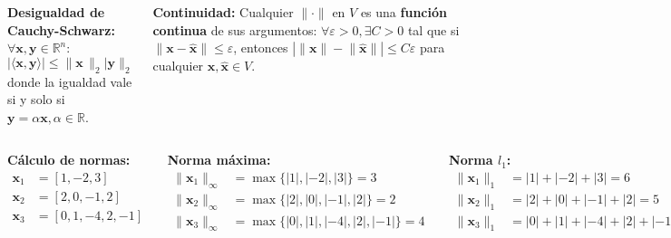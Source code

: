 \documentclass[9pt, aspectratio=169]{beamer}
\begin{document}
\begin{frame}
\begin{columns}[t]
\textbf{Desigualdad de Cauchy-Schwarz:} $\forall \bm{x}, \bm{y} \in \mathbb{R}^n$:
\[ | \langle \bm{x}, \bm{y} \rangle | \leq \lVert \bm{x} \, \rVert_2 \lvert \bm{y} \rVert_2 \]
donde la igualdad vale si y solo si $\bm{y} = \alpha \bm{x}, \alpha \in \mathbb{R}$.

\textbf{Continuidad:} Cualquier $\lVert \cdot \rVert$ en $V$ es una \textbf{función continua} de sus argumentos: $\forall \varepsilon > 0, \exists C > 0$ tal que si $\lVert \bm{x} - \hat{\bm{x}} \rVert \leq \varepsilon$, entonces $| \lVert \bm{x} \rVert - \lVert \hat{\bm{x}} \rVert | \leq C \varepsilon$ para cualquier $\bm{x}, \hat{\bm{x}} \in V$.
\end{columns}
\end{frame}

\begin{frame}
\begin{columns}[t]
\textbf{Cálculo de normas:}
\begin{align*}
    \bm{x}_1 &= [1, -2, 3] \\
    \bm{x}_2 &= [2, 0, -1, 2] \\
    \bm{x}_3 &= [0, 1, -4, 2, -1] \\
\end{align*}

\textbf{Norma máxima:}
\begin{align*}
\lVert  \bm{x}_1 \rVert_{\infty} &= \max \{|1|, |-2|, |3|\} = 3\\
\lVert  \bm{x}_2 \rVert_{\infty} &= \max \{|2|, |0|, |-1|, |2|\} = 2\\
\lVert  \bm{x}_3 \rVert_{\infty} &= \max \{|0|, |1|, |-4|, |2|, |-1|\} = 4 \\
\end{align*}

\textbf{Norma $l_1$:}
\begin{align*}
\lVert  \bm{x}_1 \rVert_1 &=  |1| + |-2| + |3| = 6\\
\lVert  \bm{x}_2 \rVert_1 &= |2| + |0| + |-1| + |2|= 5\\
\lVert  \bm{x}_3 \rVert_1 &= |0| +|1| + |-4| + |2| + |-1| = 8 \\
\end{align*}

\textbf{Norma $l_2$:}
\begin{align*}
    \lVert  \bm{x}_1 \rVert_2 &= \sqrt{|1|^2 + |-2|^2 + |3|^2} = \sqrt{14} \approx 3.74\\
    \lVert  \bm{x}_2 \rVert_2 &= \sqrt{|2|^2 + |0|^2 + |-1|^2 + |2|^2}= \sqrt{9} =3\\
    \lVert  \bm{x}_3 \rVert_2 &= \sqrt{|0|^2 +|1|^2 + |-4|^2 + |2|^2 + |-1|^2} = \sqrt{22} \approx 4.69\\
\end{align*}
\end{columns}
\end{frame}
\end{document}

